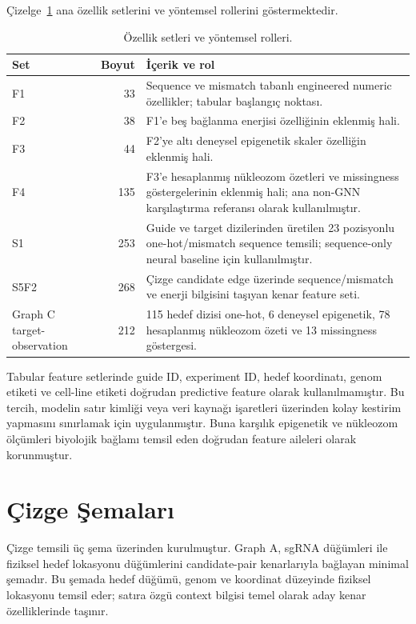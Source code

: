 Çizelge~\ref{tab:feature-sets} ana özellik setlerini ve yöntemsel rollerini göstermektedir.

\begin{table}[htbp]
\caption{Özellik setleri ve yöntemsel rolleri.}
\label{tab:feature-sets}
\centering
\small
\begin{tabularx}{\textwidth}{l r X}
\toprule\toprule
Set & Boyut & İçerik ve rol\\
\midrule
F1 & 33 & Sequence ve mismatch tabanlı engineered numeric özellikler; tabular başlangıç noktası.\\
F2 & 38 & F1'e beş bağlanma enerjisi özelliğinin eklenmiş hali.\\
F3 & 44 & F2'ye altı deneysel epigenetik skaler özelliğin eklenmiş hali.\\
F4 & 135 & F3'e hesaplanmış nükleozom özetleri ve missingness göstergelerinin eklenmiş hali; ana non-GNN karşılaştırma referansı olarak kullanılmıştır.\\
S1 & 253 & Guide ve target dizilerinden üretilen 23 pozisyonlu one-hot/mismatch sequence temsili; sequence-only neural baseline için kullanılmıştır.\\
S5F2 & 268 & Çizge candidate edge üzerinde sequence/mismatch ve enerji bilgisini taşıyan kenar feature seti.\\
Graph C target-observation & 212 & 115 hedef dizisi one-hot, 6 deneysel epigenetik, 78 hesaplanmış nükleozom özeti ve 13 missingness göstergesi.\\
\bottomrule
\end{tabularx}
\end{table}

Tabular feature setlerinde guide ID, experiment ID, hedef koordinatı, genom etiketi ve cell-line etiketi doğrudan predictive feature olarak kullanılmamıştır. Bu tercih, modelin satır kimliği veya veri kaynağı işaretleri üzerinden kolay kestirim yapmasını sınırlamak için uygulanmıştır. Buna karşılık epigenetik ve nükleozom ölçümleri biyolojik bağlamı temsil eden doğrudan feature aileleri olarak korunmuştur.

\section{Çizge Şemaları}

Çizge temsili üç şema üzerinden kurulmuştur. Graph A, sgRNA düğümleri ile fiziksel hedef lokasyonu düğümlerini candidate-pair kenarlarıyla bağlayan minimal şemadır. Bu şemada hedef düğümü, genom ve koordinat düzeyinde fiziksel lokasyonu temsil eder; satıra özgü context bilgisi temel olarak aday kenar özelliklerinde taşınır.

